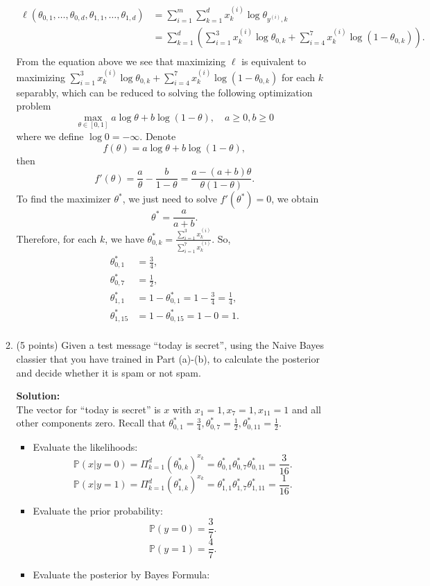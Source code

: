 \documentclass[twoside,10pt]{article}
\begin{document}
\begin{enumerate}
\begin{enumerate}
\begin{tcolorbox}
\begin{align*}
\ell(\theta_{0,1}, \ldots, \theta_{0, d}, \theta_{1,1}, \ldots, \theta_{1, d}) & = \sum_{i=1}^m \sum_{k=1}^d x_k^{(i)} \log \theta_{y^{(i)}, k} \\
& = \sum_{k=1}^d ( \sum_{i=1}^3 x_k^{(i)} \log \theta_{0,k} + \sum_{i= 4}^7 x_{k}^{(i)} \log (1-\theta_{0,k}) ).\\
\end{align*}
From the equation above we see that maximizing $\ell$ is equivalent to maximizing $\sum_{i=1}^3 x_k^{(i)} \log \theta_{0,k} + \sum_{i= 4}^7 x_{k}^{(i)} \log (1-\theta_{0,k})$ for each $k$ separably, which can be reduced to solving the following optimization problem 
$$\max_{\theta \in [0,1]} a \log \theta + b \log (1- \theta), \quad a \geq 0, b\geq 0$$
where we define $\log 0 = -\infty$.
Denote $$f(\theta) = a \log \theta + b \log (1- \theta),$$ then $$ f'(\theta) = \frac a \theta - \frac b {1-\theta} = \frac{a - (a+b)\theta}{\theta(1-\theta)}. $$ To find the maximizer $\theta^*$, we just need to solve $f'(\theta^*) = 0$, we obtain $$\theta^* = \frac{a}{a+b}.$$
Therefore, for each $k$, we have $\theta_{0,k}^* = \frac{\sum_{i=1}^3 x^{(i)}_k}{\sum_{i=1}^7 x^{(i)}_k}$. So, 
\begin{align*}
\theta_{0,1}^* &= \frac 3 4,\\
\theta_{0,7}^* &= \frac 1 2,\\
\theta_{1,1}^* &= 1-  \theta_{0,1}^*  = 1- \frac 3 4 = \frac 1 4,\\
\theta_{1,15}^* &= 1-  \theta_{0,15}^*  = 1 -  0 = 1.\\
\end{align*}
\end{tcolorbox}

\item (5 points) Given a test message ``\textsf{today is secret}'', using the Naive Bayes classier that you have trained in Part (a)-(b), to calculate the posterior and decide whether it is spam or not spam.
\begin{tcolorbox}
\textbf{Solution:}\\
The vector for ``\textsf{today is secret}'' is $x$ with $x_1= 1, x_7=1,x_{11}= 1$ and all other components zero. 
Recall that $ \theta_{0,1}^* = \frac 3 4, \theta_{0,7}^* = \frac 1 2, \theta^*_{0,11} = \frac 1 2. $
\begin{itemize}
\item Evaluate the likelihoods:\\
$$\mathbb P(x|y=0) = \Pi _{k=1}^d (\theta^*_{0,k})^{x_k} = \theta^*_{0,1} \theta^*_{0,7} \theta^*_{0,11} = \frac 3 {16}.$$
$$\mathbb P(x|y=1) = \Pi _{k=1}^d (\theta^*_{1,k})^{x_k} = \theta^*_{1,1} \theta^*_{1,7} \theta^*_{1,11} = \frac 1 {16}.$$
\item Evaluate the prior probability: \\
$$\mathbb P(y = 0) = \frac 3 7.$$ $$\mathbb P(y = 1) = \frac 4 7.$$
\item Evaluate the posterior by Bayes Formula: \\


\end{itemize}
\end{tcolorbox}
\end{enumerate}
\end{enumerate}
\end{document}
